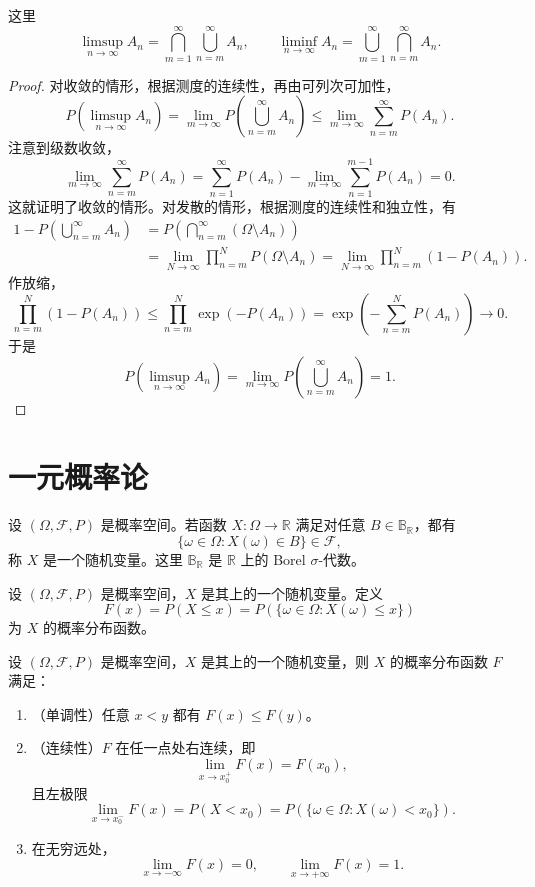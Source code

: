 这里
\[
\limsup_{n\to\infty}A_n=\bigcap_{m=1}^{\infty}\bigcup_{n=m}^{\infty}A_n,
\qquad
\liminf_{n\to\infty}A_n=\bigcup_{m=1}^{\infty}\bigcap_{n=m}^{\infty}A_n.
\]

\begin{proof}
对收敛的情形，根据测度的连续性，再由可列次可加性，
\[
P\left(\limsup_{n\to\infty}A_n\right)
=\lim_{m\to\infty}P\left(\bigcup_{n=m}^{\infty}A_n\right)
\leq\lim_{m\to\infty}\sum_{n=m}^{\infty}P(A_n).
\]
注意到级数收敛，
\[
\lim_{m\to\infty}\sum_{n=m}^{\infty}P(A_n)
=\sum_{n=1}^{\infty}P(A_n)-\lim_{m\to\infty}\sum_{n=1}^{m-1}P(A_n)=0.
\]
这就证明了收敛的情形。对发散的情形，根据测度的连续性和独立性，有
\[
\begin{aligned}
1-P\left(\bigcup_{n=m}^{\infty}A_n\right)
&=P\left(\bigcap_{n=m}^{\infty}(\Omega\setminus A_n)\right)\\
&=\lim_{N\to\infty}\prod_{n=m}^{N}P(\Omega\setminus A_n)
=\lim_{N\to\infty}\prod_{n=m}^{N}(1-P(A_n)).
\end{aligned}
\]
作放缩，
\[
\prod_{n=m}^{N}(1-P(A_n))
\leq\prod_{n=m}^{N}\exp(-P(A_n))
=\exp\left(-\sum_{n=m}^{N}P(A_n)\right)\longrightarrow0.
\]
于是
\[
P\left(\limsup_{n\to\infty}A_n\right)
=\lim_{m\to\infty}P\left(\bigcup_{n=m}^{\infty}A_n\right)=1.
\]
\end{proof}

\section{一元概率论}

\begin{definition}[随机变量]\label{def:random-variable}
设 $(\Omega,\mathcal F,P)$ 是概率空间。若函数 $X:\Omega\to\mathbb R$ 满足对任意 $B\in\mathbb B_{\mathbb R}$，都有
\[
\{\omega\in\Omega:X(\omega)\in B\}\in\mathcal F,
\]
称 $X$ 是一个随机变量。这里 $\mathbb B_{\mathbb R}$ 是 $\mathbb R$ 上的 Borel $\sigma$-代数。
\end{definition}

\begin{definition}[分布函数]\label{def:distribution-function}
设 $(\Omega,\mathcal F,P)$ 是概率空间，$X$ 是其上的一个随机变量。定义
\[
F(x)=P(X\leq x)=P(\{\omega\in\Omega:X(\omega)\leq x\})
\]
为 $X$ 的概率分布函数。
\end{definition}

\begin{proposition}\label{prop:distribution-function-properties}
设 $(\Omega,\mathcal F,P)$ 是概率空间，$X$ 是其上的一个随机变量，则 $X$ 的概率分布函数 $F$ 满足：
\begin{enumerate}
\item （单调性）任意 $x<y$ 都有 $F(x)\leq F(y)$。
\item （连续性）$F$ 在任一点处右连续，即
\[
\lim_{x\to x_0^+}F(x)=F(x_0),
\]
且左极限
\[
\lim_{x\to x_0^-}F(x)=P(X<x_0)=P(\{\omega\in\Omega:X(\omega)<x_0\}).
\]
\item 在无穷远处，
\[
\lim_{x\to-\infty}F(x)=0,\qquad\lim_{x\to+\infty}F(x)=1.
\]
\end{enumerate}
\end{proposition}

